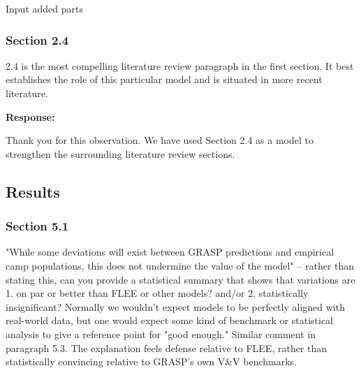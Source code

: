 \documentclass[11pt,a4paper]{article}
\begin{document}
\vspace{0.5cm}

\begin{updatebox}

Input added parts

\end{updatebox}

\vspace{0.5cm}

\subsubsection*{Section 2.4}

\begin{reviewbox}
2.4 is the most compelling literature review paragraph in the first section. It best establishes the role of this particular model and is situated in more recent literature.
\end{reviewbox}

\textbf{Response:}

Thank you for this observation. We have used Section 2.4 as a model to strengthen the surrounding literature review sections.

\vspace{0.5cm}

\subsection*{Results}

\subsubsection*{Section 5.1}

\begin{reviewbox}
"While some deviations will exist between GRASP predictions and empirical camp populations, this does not undermine the value of the model" -- rather than stating this, can you provide a statistical summary that shows that variations are 1. on par or better than FLEE or other models? and/or 2. statistically insignificant? Normally we wouldn't expect models to be perfectly aligned with real-world data, but one would expect some kind of benchmark or statistical analysis to give a reference point for "good enough."
Similar comment in paragraph 5.3. The explanation feels defense relative to FLEE, rather than statistically convincing relative to GRASP's own V\&V benchmarks.
\end{reviewbox}
\end{document}
